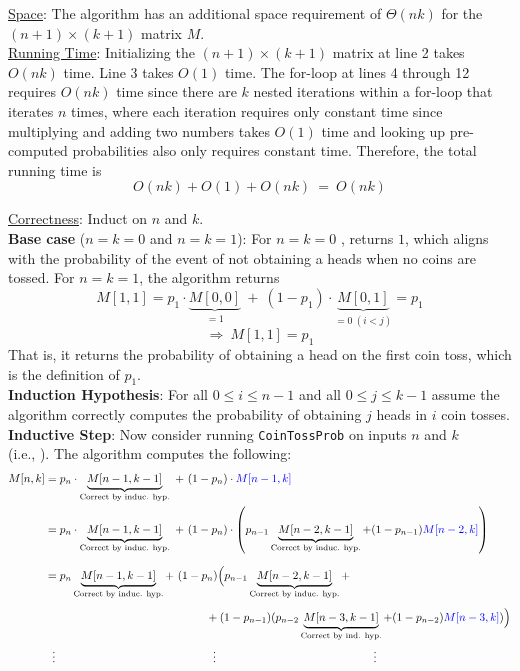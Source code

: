 \documentclass[twoside,11pt]{homework}
\begin{document}
\noindent
\underline{Space}: The algorithm has an additional space requirement of $\Theta(nk)$ for the $(n+1) \times (k+1
)$ matrix $M$.   \\

\noindent
\underline{Running Time}:  Initializing the $(n+1) \times (k+1)$ matrix at line 2 takes $O(nk)$ time.  Line 3 takes $O(1)$ time.  The for-loop at lines 4 through 12 requires $O(nk)$ time since there are $k$ nested iterations within a for-loop that iterates $n$ times,  where each iteration requires only constant time since multiplying and adding two numbers takes $O(1)$ time and looking up pre-computed probabilities also only requires constant time.  Therefore, the total running time is
$$O(nk) + O(1) + O(nk) \ = \ O(nk)$$


\noindent
\underline{Correctness}: Induct on $n$ and $k$.  \\
\noindent
\textbf{Base case} ($n = k = 0$ and $n = k = 1$):   For $n = k = 0$ ,   returns $1$, which aligns with the probability of the event of not obtaining a heads when no coins are tossed.  
For $n = k = 1$,  the algorithm returns 
$$M[1,1] = p_1 \cdot \underbrace{M[0,0]}_{=1} \ + \ (1-p_1)\cdot\underbrace{M[0,1]}_{= 0 \ (i<j)}  = p_1$$ 
$$ \Longrightarrow \ M[1,1] = p_1$$
That is, it returns the probability of obtaining a head on the first coin toss,  which is the definition of $p_1$.  \\[0.5em]
\textbf{Induction Hypothesis}: For all $0\leq i \leq n-1$ and all $0 \leq j \leq k-1$ assume the algorithm correctly computes the probability of obtaining $j$ heads in $i$ coin tosses. \\[0.4em]
\textbf{Inductive Step}:  Now consider running \texttt{CoinTossProb} on inputs $n$ and $k$ \\
 (i.e.,  ).  The algorithm computes the following:
\begin{align*}
M[n, k] &= p_n \cdot \underbrace{M[n-1, k-1]}_{\text{Correct by induc.  hyp.}} \ + \ (1-p_n) \cdot {\color{blue} M[n-1, k]} \\
& = p_n \cdot \underbrace{M[n-1, k-1]}_{\text{Correct by induc.  hyp.}} \ + \ (1-p_n) \cdot \left(p_{n-1}\underbrace{M[n-2, k-1]}_{\text{Correct by induc. hyp.}} + (1-p_{n-1}){\color{blue} M[n-2, k]} \right) \\[0.7em]
&= p_n \underbrace{M[n-1, k-1]}_{\text{Correct by induc.  hyp.}} + \ (1-p_n) \Big(p_{n-1}\underbrace{M[n-2, k-1]}_{\text{Correct by induc. hyp.}} + \\[0.4em]
& \ \ \ \ \ \ \ \ \ \ \ \ \ \ \ \ \ \ \ \ \ \ \ \ \ \ \ \ \ \ \ \ \ \ \ \ \ \ \ \ \ \ \ + (1-p_{n-1})(p_{n-2}\underbrace{M[n-3,k-1]}_{\text{Correct by ind. hyp.}} + (1-p_{n-2}){\color{blue} M[n-3, k]})\Big)  \\
& \ \ \vdots  \ \ \ \ \ \ \ \ \ \ \ \ \ \ \ \ \ \ \ \ \ \ \ \ \ \ \ \ \ \ \ \ \ \ \ \ \ \ \ \ \ \ \vdots \ \ \ \ \ \ \ \ \ \ \ \ \ \ \ \ \ \ \ \ \ \ \ \ \ \ \ \ \ \ \ \ \ \ \ \ \ \ \ \ \ \ \vdots 
\end{align*}
\end{document}
